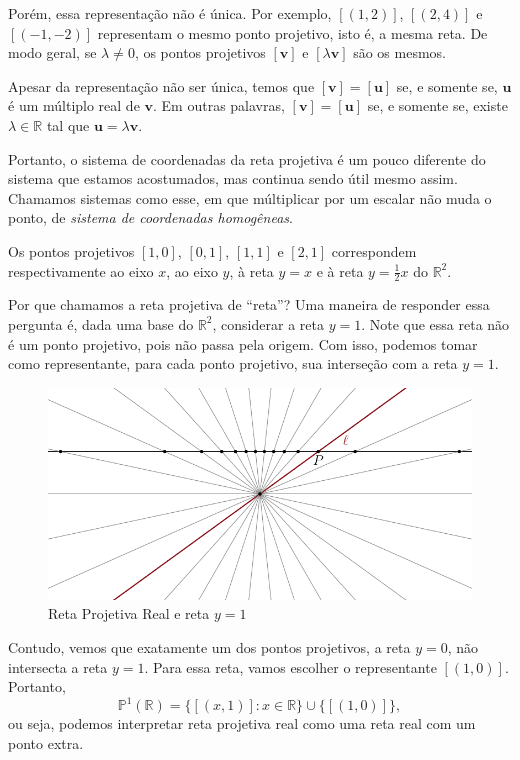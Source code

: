 Porém, essa representação não é única.
Por exemplo, \([(1, 2)]\), \([(2, 4)]\) e \([(-1, -2)]\) representam o mesmo ponto projetivo, isto é, a mesma reta.
De modo geral, se \(\lambda \neq 0\), os pontos projetivos \([\mathbf{v}]\) e \([\lambda \mathbf{v}]\) são os mesmos.

Apesar da representação não ser única, temos que \([\mathbf{v}] = [\mathbf{u}]\) se, e somente se, \(\mathbf{u}\) é um múltiplo real de \(\mathbf{v}\).
Em outras palavras, \([\mathbf{v}] = [\mathbf{u}]\) se, e somente se, existe \(\lambda \in \mathbb{R}\) tal que \(\mathbf{u} = \lambda\mathbf{v}\).

Portanto, o sistema de coordenadas da reta projetiva é um pouco diferente do sistema que estamos acostumados, mas continua sendo útil mesmo assim.
Chamamos sistemas como esse, em que múltiplicar por um escalar não muda o ponto, de \emph{sistema de coordenadas homogêneas}.

\begin{exmp}
Os pontos projetivos $[1,0]$, $[0,1]$, $[1,1]$ e $[2,1]$ correspondem respectivamente ao eixo $x$, ao eixo $y$, à reta $y=x$ e à reta $y=\frac{1}{2}x$ do $\mathbb{R}^2$.
\end{exmp}

Por que chamamos a reta projetiva de ``reta''? Uma maneira de responder essa pergunta é, dada uma base do $\mathbb{R}^2$, considerar a reta $y=1$.
Note que essa reta não é um ponto projetivo, pois não passa pela origem. Com isso, podemos tomar como representante, para cada ponto projetivo, sua interseção com a reta $y=1$.

\begin{figure}[hbtp]
  \centering
  \includegraphics{figures/retaprojetivaretay1.pdf}
  \caption{Reta Projetiva Real e reta \(y = 1\)}
\end{figure}

Contudo, vemos que exatamente um dos pontos projetivos, a reta \(y = 0\), não intersecta a reta \(y = 1\).
Para essa reta, vamos escolher o representante $[(1,0)]$.
Portanto, 
\begin{equation} \label{eqn:retaprojetivaretaponto}
	\mathbb{P}^1(\mathbb{R}) = \{ [(x,1)] : x \in \mathbb{R} \} \cup \{[(1,0)]\},
\end{equation}
ou seja, podemos interpretar reta projetiva real como uma reta real com um ponto extra.


